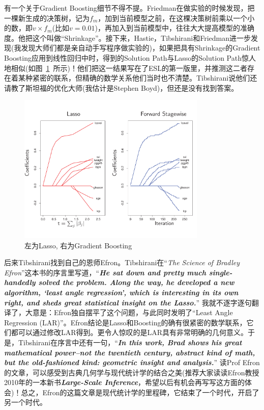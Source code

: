 \documentclass{cosart-xetex}
\begin{document}
有一个关于Gradient Boosting细节不得不提。Friedman在做实验的时候发现，把一棵新生成的决策树，记为$f_m$，加到当前模型之前，在这棵决策树前乘以一个小的数，即$v \times f_m$(比如$v = 0.01$)，再加入到当前模型中，往往大大提高模型的准确度。他把这个叫做“Shrinkage”。接下来，Hastie，Tibshirani和Friedman进一步发现(我发现大师们都是亲自动手写程序做实验的)，如果把具有Shrinkage的Gradient Boosting应用到线性回归中时，得到的Solution Path与Lasso的Solution Path惊人地相似(如图~\ref{fig1}~所示)！他们把这一结果写在了ESL的第一版里，并推测这二者存在着某种紧密的联系，但精确的数学关系他们当时也不清楚。Tibshirani说他们还请教了斯坦福的优化大师(我估计是Stephen Boyd)，但还是没有找到答案。
\begin{figure}[htbp]
\centering
\includegraphics[width=0.8\textwidth]{identical.pdf}
\caption{左为Lasso, 右为Gradient Boosting} \label{fig1}
\end{figure}

后来Tibshirani找到自己的恩师Efron。Tibshirani在“\textit{The Science of Bradley Efron}”这本书的序言里写道，“\textit{\textbf{He sat down and pretty much single-handedly solved the problem. Along the way, he developed a new algorithm, `least angle regression', which is interesting in its own right, and sheds great statistical insight on the Lasso.}}” 我就不逐字逐句翻译了，大意是：Efron独自摆平了这个问题，与此同时发明了“Least Angle Regression (LAR)”。Efron结论是Lasso和Boosting的确有很紧密的数学联系，它们都可以通过修改LAR得到。更令人惊叹的是LAR具有非常明确的几何意义。于是，Tibshirani在序言中还有一句，“\textit{\textbf{In this work, Brad shows his great mathematical power–not the twentieth century, abstract kind of math, but the old-fashioned kind: geometric insight and analysis.}}” 读Prof Efron的文章，可以感受到古典几何学与现代统计学的结合之美(推荐大家读读Efron教授2010年的一本新书\textit{\textbf{Large-Scale Inference}}，希望以后有机会再写写这方面的体会)！总之，Efron的这篇文章是现代统计学的里程碑，它结束了一个时代，开启了另一个时代。
\end{document}
